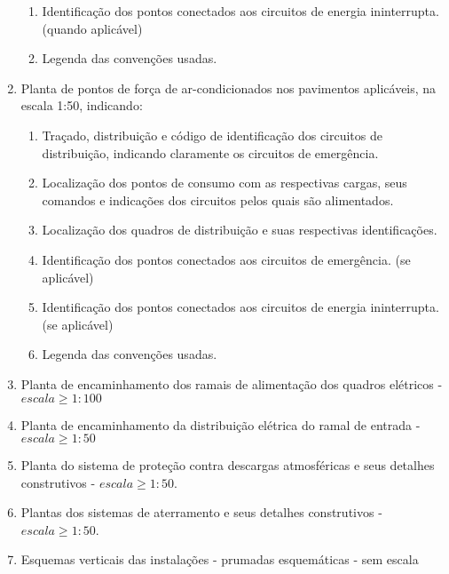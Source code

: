\begin{enumerate}
\begin{enumerate}
			\item Identificação dos pontos conectados aos circuitos de energia ininterrupta. (quando aplicável)
			
			\item Legenda das convenções usadas.
		\end{enumerate}


		\item Planta de pontos de força de ar-condicionados nos pavimentos aplicáveis, na escala 1:50, indicando:
		\begin{enumerate}
			\item Traçado, distribuição e código de identificação dos circuitos de distribuição, indicando claramente os circuitos de emergência.
			
			\item Localização dos pontos de consumo com as respectivas cargas, seus comandos e indicações dos circuitos pelos quais são alimentados.
			
			\item Localização dos quadros de distribuição e suas respectivas identificações.
			
			\item Identificação dos pontos conectados aos circuitos de emergência. (se aplicável)
			
			\item Identificação dos pontos conectados aos circuitos de energia ininterrupta. (se aplicável)
			
			\item Legenda das convenções usadas.
		\end{enumerate}

		\item Planta de encaminhamento dos ramais de alimentação dos quadros elétricos - $escala \geq 1:100$

		\item Planta de encaminhamento da distribuição elétrica do ramal de entrada - $escala \geq 1:50$

		\item Planta do sistema de proteção contra descargas atmosféricas e seus detalhes construtivos - $escala \geq 1:50$.

		\item Plantas dos sistemas de aterramento e seus detalhes construtivos - $escala \geq 1:50$.
		
		\item Esquemas verticais das instalações - prumadas esquemáticas - sem escala


\end{enumerate}
